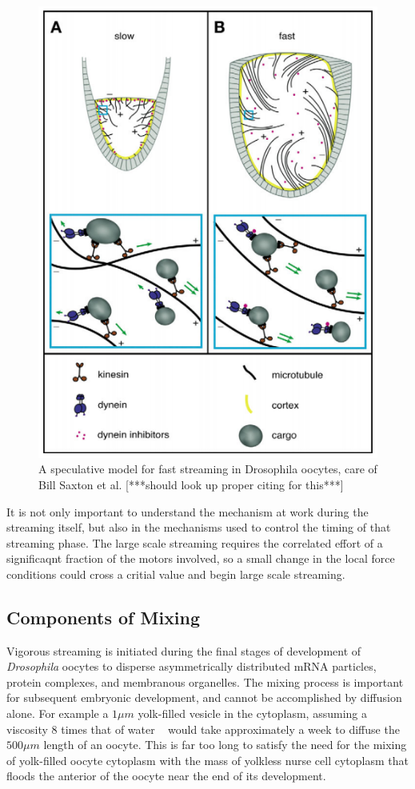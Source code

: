 \documentclass[11pt]{ucthesis}
\begin{document}
\begin{figure}[htp]
\begin{center}
\includegraphics[width=0.5\hsize]{biomodel.png}
\caption{ 
A speculative model for fast streaming in Drosophila oocytes, care of Bill Saxton et al. [***should look up proper citing for this***]
}
\label{fig:spheres}
\end{center}
\end{figure}



It is not only important to understand the mechanism at work during the streaming itself, but also in the mechanisms used to control the timing of that streaming phase.
The large scale streaming requires the correlated effort of a significaqnt fraction of the motors involved, so a small change in the local force conditions could cross a critial value and begin large scale streaming.


\subsection{Components of Mixing}


Vigorous streaming is initiated during the final stages of
development of {\em Drosophila} oocytes to disperse asymmetrically
distributed mRNA particles, protein complexes, and membranous
organelles.  The mixing process is important for subsequent
embryonic development, and cannot be accomplished by
diffusion alone.  For example  a $ 1\mu m$ yolk-filled vesicle in
the cytoplasm, assuming a viscosity 8 times that of water ~\cite{LubyPhelps}
would take approximately a week to diffuse the $500 \mu m$  length
of an oocyte. This is far too long to satisfy the need for the mixing
of yolk-filled oocyte cytoplasm with the mass of yolkless nurse
cell cytoplasm that floods the anterior of the oocyte near the
end of its development.
\end{document}
